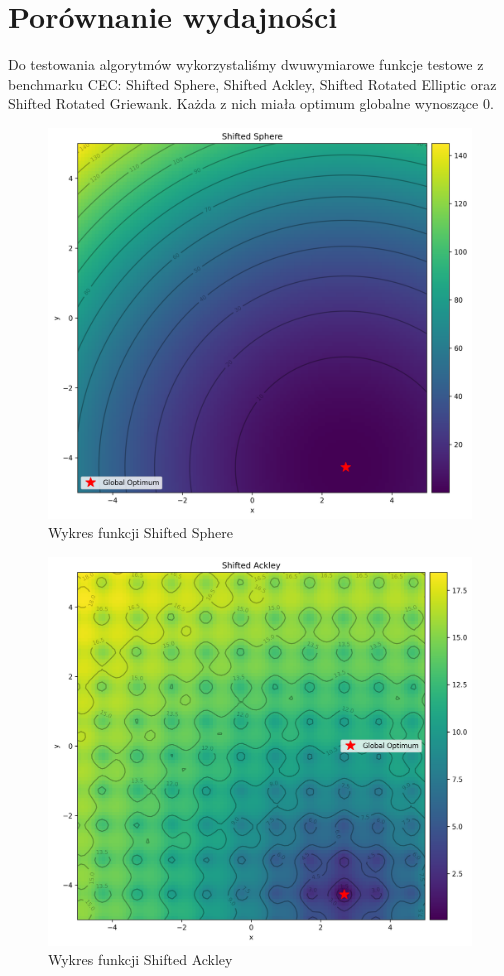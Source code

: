 \documentclass{article}
\begin{document}
\section{Porównanie wydajności}

Do testowania algorytmów wykorzystaliśmy dwuwymiarowe funkcje testowe z benchmarku CEC: Shifted Sphere, Shifted Ackley, Shifted Rotated Elliptic oraz Shifted Rotated Griewank. Każda z nich miała optimum globalne wynoszące 0.

\begin{figure}[H]
    \centering
    \includegraphics[width=\textwidth]{shifted_sphere.png}
    \caption{Wykres funkcji Shifted Sphere}
    \label{fig:plot1}
\end{figure}

\begin{figure}[H]
    \centering
    \includegraphics[width=\textwidth]{shifted_ackley.png}
    \caption{Wykres funkcji Shifted Ackley}
    \label{fig:plot2}
\end{figure}
\end{document}
